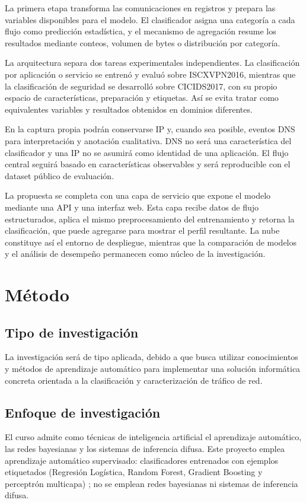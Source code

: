 \documentclass[conference]{IEEEtran}
\begin{document}
La primera etapa transforma las comunicaciones en registros y prepara las variables disponibles para el modelo. El clasificador asigna una categoría a cada flujo como predicción estadística, y el mecanismo de agregación resume los resultados mediante conteos, volumen de bytes o distribución por categoría.

La arquitectura separa dos tareas experimentales independientes. La clasificación por aplicación o servicio se entrenó y evaluó sobre ISCXVPN2016, mientras que la clasificación de seguridad se desarrolló sobre CICIDS2017, con su propio espacio de características, preparación y etiquetas. Así se evita tratar como equivalentes variables y resultados obtenidos en dominios diferentes.

En la captura propia podrán conservarse IP y, cuando sea posible, eventos DNS para interpretación y anotación cualitativa. DNS no será una característica del clasificador y una IP no se asumirá como identidad de una aplicación. El flujo central seguirá basado en características observables y será reproducible con el dataset público de evaluación.

La propuesta se completa con una capa de servicio que expone el modelo mediante una API y una interfaz web. Esta capa recibe datos de flujo estructurados, aplica el mismo preprocesamiento del entrenamiento y retorna la clasificación, que puede agregarse para mostrar el perfil resultante. La nube constituye así el entorno de despliegue, mientras que la comparación de modelos y el análisis de desempeño permanecen como núcleo de la investigación.

\section{Método}

\subsection{Tipo de investigación}
La investigación será de tipo aplicada, debido a que busca utilizar conocimientos y métodos de aprendizaje automático para implementar una solución informática concreta orientada a la clasificación y caracterización de tráfico de red.

\subsection{Enfoque de investigación}
El curso admite como técnicas de inteligencia artificial el aprendizaje automático, las redes bayesianas y los sistemas de inferencia difusa. Este proyecto emplea aprendizaje automático supervisado: clasificadores entrenados con ejemplos etiquetados (Regresión Logística, Random Forest, Gradient Boosting y perceptrón multicapa) \cite{hastie2009,bishop2024}; no se emplean redes bayesianas ni sistemas de inferencia difusa.
\end{document}
